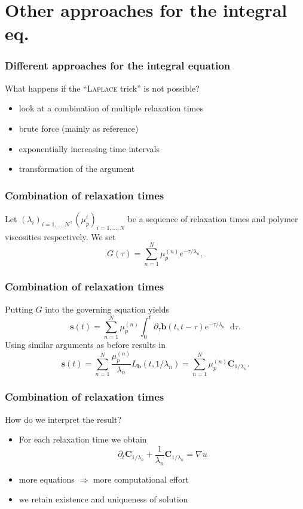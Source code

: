 \documentclass[12pt,a4paper,handout]{beamer}
\theoremstyle{definition}
\theoremstyle{plain}
\newcommand{\bfb}{\bm{b}}
\newcommand{\bfs}{\bm{s}}
\newcommand{\bfC}{\bm{C}}
\newcommand{\D}{\mathop{}\!\mathrm{d}}
\begin{document}
\section{Other approaches for the integral eq.}
\begin{frame}
\frametitle{Different approaches for the integral equation}
    What happens if the \enquote{\textsc{Laplace} trick} is not possible? 
    \begin{itemize}[<+->]
        \item look at a combination of multiple relaxation times
        \item brute force (mainly as reference)
        \item exponentially increasing time intervals
        \item transformation of the argument
    \end{itemize}
\end{frame}
\begin{frame}
    \frametitle{Combination of relaxation times}
    Let $(\lambda_i)_{i=1,\dotsc,N},(\mu_p^i)_{i=1,\dotsc,N}$ be a sequence of relaxation times and polymer viscosities respectively. We set
    \begin{equation*}
    G(\tau)=\sum_{n=1}^{N}\mu_p^{(n)}e^{-\tau/\lambda_n},
    \end{equation*}
\end{frame}
\begin{frame}
    \frametitle{Combination of relaxation times}
    Putting $G$ into the governing equation yields
    \begin{equation*}
    \bfs(t) = \sum_{n=1}^{N}\mu_p^{(n)}\int_0^t\partial_\tau \bfb(t,t-\tau)e^{-\tau/\lambda_n}\D\tau.
    \end{equation*}
    Using similar arguments as before results in 
    \begin{equation}
    \bfs(t)=\sum_{n=1}^N\frac{\mu_p^{(n)}}{\lambda_n}L_{\bfb}(t,1/\lambda_n)=\sum_{n=1}^N\mu_p^{(n)}\bfC_{1/\lambda_n}.
    \end{equation}
\end{frame}
\begin{frame}
    \frametitle{Combination of relaxation times}
    How do we interpret the result?
    \begin{itemize}[<+->]
        \item For each relaxation time we obtain
        \begin{equation*}
            \partial_t \bfC_{1/\lambda_n}+\frac{1}{\lambda_n}\bfC_{1/\lambda_n}=\nabla u
        \end{equation*}
        \item more equations $\Rightarrow$ more computational effort
        \item we retain existence and uniqueness of solution
    \end{itemize}
\end{frame}
\end{document}
